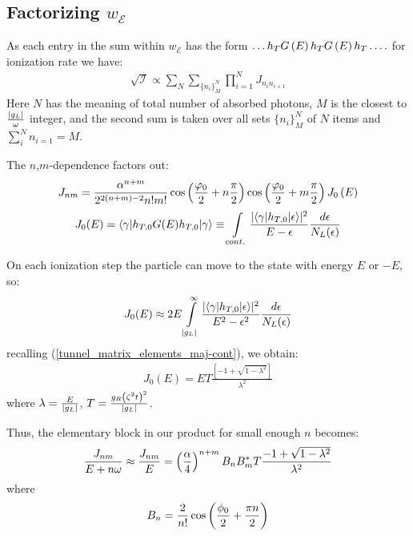\subsection{Factorizing $ w_\mathcal{E} $}
As each entry in the sum within $ w_{\mathcal{E}} $ has the form $ \dots h_TG\left(E\right)h_TG\left(E\right)h_T\dots. $  for ionization rate we have:
\begin{gather}
	\sqrt{\mathcal{I}}\propto
	\sum_N \sum_{\{n_i\}_M^N}\prod_{i=1}^{N}J_{n_in_{i+1}}
\end{gather}
Here $ N $ has the meaning of total number of absorbed photons, $ M $ is the closest to $ \frac{\left|g_L\right|}{\omega }$ integer, and the second sum is taken over all sets $ \{n_i\}_M^N $ of $ N $ items and $ \sum_i^N n_{i=1} = M$.

 The $ n $,$ m $-dependence factors out:
\begin{gather}
J_{nm}
=
	\frac{\alpha^{n+m}}
	{2^{2\left(n+m\right)-2}n!m!}
	\cos\left(\frac{\varphi_{0}}{2}+n\frac{\pi}{2}\right)
	\cos\left(\frac{\varphi_{0}}{2}+m\frac{\pi}{2}\right)
	J_0\left(E\right)
\end{gather}
\begin{gather}
	J_{0}(E)
	=
	\langle\gamma|h_{T,0}G(E)h_{T,0}|\gamma\rangle
	\equiv
	\intop_{cont.}\frac{|\langle\gamma|h_{T,0}|\epsilon\rangle|^{2}}{E-\epsilon}\frac{d\epsilon}{N_L(\epsilon)}
\end{gather}

On each ionization step  the particle can move to the state with energy $ E $ or $ -E $, so:
\begin{gather}
	J_{0}(E)
	\approx
	2E\intop_{|g_{L}|}^{\infty}\frac{|\langle\gamma|h_{T,0}|\epsilon\rangle|^{2}}{E^{2}-\epsilon^{2}}\frac{d\epsilon}{N_L(\epsilon)}
\end{gather}
recalling (\ref{tunnel_matrix_elements_maj-cont}), we obtain:
\begin{gather}
		J_{0}(E)
		=
		ET\frac{\left[-1+\sqrt{1-\lambda^{2}}\right]}{\lambda^{2}}
\end{gather}
where $ \lambda = \frac{E}{\left|g_L\right|} $, $ T=\frac{g_R\left(\zeta^2t\right)^2}{\left|g_L\right|} $.

Thus, the elementary block  in our product for small enough $ n $ becomes:
\begin{gather}
	\frac{J_{nm}}{E+n\omega}
	\approx
	\frac{J_{nm}}{E}
	=
	\left(\frac{\alpha}{4}\right)^{n+m}
	B_n B_m^* T
	\frac{-1+\sqrt{1-\lambda^2}}{\lambda^2}
\end{gather}
where
\begin{gather}
	B_n=
	\frac{2}{n!}\cos\left(\frac{\phi_0}{2}+\frac{\pi n}{2}\right)
\end{gather}

